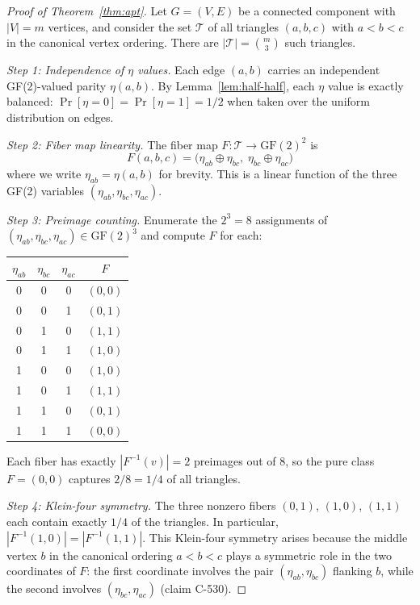 \documentclass[12pt]{article}
\theoremstyle{definition}
\theoremstyle{plain}
\theoremstyle{remark}
\begin{document}
\begin{proof}[Proof of Theorem~\ref{thm:apt}]
Let $G = (V, E)$ be a connected component with $|V| = m$ vertices, and
consider the set $\mathcal{T}$ of all triangles $(a,b,c)$ with
$a < b < c$ in the canonical vertex ordering.  There are
$|\mathcal{T}| = \binom{m}{3}$ such triangles.

\emph{Step 1: Independence of $\eta$ values.}
Each edge $(a,b)$ carries an independent GF(2)-valued parity $\eta(a,b)$.
By Lemma~\ref{lem:half-half}, each $\eta$ value is exactly balanced:
$\Pr[\eta = 0] = \Pr[\eta = 1] = 1/2$ when taken over the uniform
distribution on edges.

\emph{Step 2: Fiber map linearity.}
The fiber map $F: \mathcal{T} \to \mathrm{GF}(2)^2$ is
\begin{equation}
  F(a,b,c) = \bigl(\eta_{ab} \oplus \eta_{bc},\;
    \eta_{bc} \oplus \eta_{ac}\bigr)
\end{equation}
where we write $\eta_{ab} = \eta(a,b)$ for brevity.  This is a linear
function of the three GF(2) variables $(\eta_{ab}, \eta_{bc}, \eta_{ac})$.

\emph{Step 3: Preimage counting.}
Enumerate the $2^3 = 8$ assignments of $(\eta_{ab}, \eta_{bc}, \eta_{ac})
\in \mathrm{GF}(2)^3$ and compute $F$ for each:
\begin{center}
\begin{tabular}{cccc}
\toprule
$\eta_{ab}$ & $\eta_{bc}$ & $\eta_{ac}$ & $F$ \\
\midrule
0 & 0 & 0 & $(0,0)$ \\
0 & 0 & 1 & $(0,1)$ \\
0 & 1 & 0 & $(1,1)$ \\
0 & 1 & 1 & $(1,0)$ \\
1 & 0 & 0 & $(1,0)$ \\
1 & 0 & 1 & $(1,1)$ \\
1 & 1 & 0 & $(0,1)$ \\
1 & 1 & 1 & $(0,0)$ \\
\bottomrule
\end{tabular}
\end{center}
Each fiber has exactly $|F^{-1}(v)| = 2$ preimages out of 8, so the pure
class $F = (0,0)$ captures $2/8 = 1/4$ of all triangles.

\emph{Step 4: Klein-four symmetry.}
The three nonzero fibers $(0,1)$, $(1,0)$, $(1,1)$ each contain exactly
$1/4$ of the triangles.  In particular, $|F^{-1}(1,0)| = |F^{-1}(1,1)|$.
This Klein-four symmetry arises because the middle vertex $b$ in the
canonical ordering $a < b < c$ plays a symmetric role in the two
coordinates of $F$: the first coordinate involves the pair
$(\eta_{ab}, \eta_{bc})$ flanking $b$, while the second involves
$(\eta_{bc}, \eta_{ac})$ (claim C-530).
\end{proof}
\end{document}
